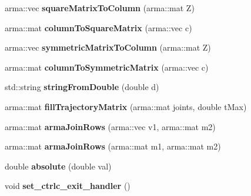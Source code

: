 \begin{DoxyCompactItemize}
\item 
\hypertarget{namespacekukadu_a66cd2d039457ad6fe13c55450ec6357d}{arma\-::vec {\bfseries square\-Matrix\-To\-Column} (arma\-::mat Z)}\label{namespacekukadu_a66cd2d039457ad6fe13c55450ec6357d}

\item 
\hypertarget{namespacekukadu_a8d2e88a98c08cbfd87d18b1a3b4d1298}{arma\-::mat {\bfseries column\-To\-Square\-Matrix} (arma\-::vec c)}\label{namespacekukadu_a8d2e88a98c08cbfd87d18b1a3b4d1298}

\item 
\hypertarget{namespacekukadu_aca8d32e86c74fc56cbc550bd94f60d3d}{arma\-::vec {\bfseries symmetric\-Matrix\-To\-Column} (arma\-::mat Z)}\label{namespacekukadu_aca8d32e86c74fc56cbc550bd94f60d3d}

\item 
\hypertarget{namespacekukadu_a32697d90452b54037e5a425ba1ced6ff}{arma\-::mat {\bfseries column\-To\-Symmetric\-Matrix} (arma\-::vec c)}\label{namespacekukadu_a32697d90452b54037e5a425ba1ced6ff}

\item 
\hypertarget{namespacekukadu_af021770f184a52bcf84ff0941df261b9}{std\-::string {\bfseries string\-From\-Double} (double d)}\label{namespacekukadu_af021770f184a52bcf84ff0941df261b9}

\item 
\hypertarget{namespacekukadu_aa92edac0d1f170818da990b6f3f57bf4}{arma\-::mat {\bfseries fill\-Trajectory\-Matrix} (arma\-::mat joints, double t\-Max)}\label{namespacekukadu_aa92edac0d1f170818da990b6f3f57bf4}

\item 
\hypertarget{namespacekukadu_adfb0b5a62a292323b452e90d071da4ea}{arma\-::mat {\bfseries arma\-Join\-Rows} (arma\-::vec v1, arma\-::mat m2)}\label{namespacekukadu_adfb0b5a62a292323b452e90d071da4ea}

\item 
\hypertarget{namespacekukadu_a3fc360dd62f44f1ed05b93719cf25e51}{arma\-::mat {\bfseries arma\-Join\-Rows} (arma\-::mat m1, arma\-::mat m2)}\label{namespacekukadu_a3fc360dd62f44f1ed05b93719cf25e51}

\item 
\hypertarget{namespacekukadu_adf087f4f1f69f316365a414842f51512}{double {\bfseries absolute} (double val)}\label{namespacekukadu_adf087f4f1f69f316365a414842f51512}

\item 
\hypertarget{namespacekukadu_ad4e11f6abb484a595bba462ac88f9605}{void {\bfseries set\-\_\-ctrlc\-\_\-exit\-\_\-handler} ()}\label{namespacekukadu_ad4e11f6abb484a595bba462ac88f9605}


\end{DoxyCompactItemize}
